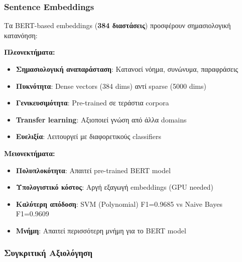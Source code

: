 \documentclass[12pt,a4paper,twoside]{book}
\begin{document}
\subsubsection{Sentence Embeddings}

Τα BERT-based embeddings (\textbf{384 διαστάσεις}) προσφέρουν σημασιολογική κατανόηση:

\textbf{Πλεονεκτήματα:}
\begin{itemize}
    \item \textbf{Σημασιολογική αναπαράσταση}: Κατανοεί νόημα, συνώνυμα, παραφράσεις
    \item \textbf{Πυκνότητα}: Dense vectors (384 dims) αντί sparse (5000 dims)
    \item \textbf{Γενικευσιμότητα}: Pre-trained σε τεράστια corpora
    \item \textbf{Transfer learning}: Αξιοποιεί γνώση από άλλα domains
    \item \textbf{Ευελιξία}: Λειτουργεί με διαφορετικούς classifiers
\end{itemize}

\textbf{Μειονεκτήματα:}
\begin{itemize}
    \item \textbf{Πολυπλοκότητα}: Απαιτεί pre-trained BERT model
    \item \textbf{Υπολογιστικό κόστος}: Αργή εξαγωγή embeddings (GPU needed)
    \item \textbf{Καλύτερη απόδοση}: SVM (Polynomial) F1=0.9685 vs Naive Bayes F1=0.9609
    \item \textbf{Μνήμη}: Απαιτεί περισσότερη μνήμη για το BERT model
\end{itemize}

\subsubsection{Συγκριτική Αξιολόγηση}
\end{document}
